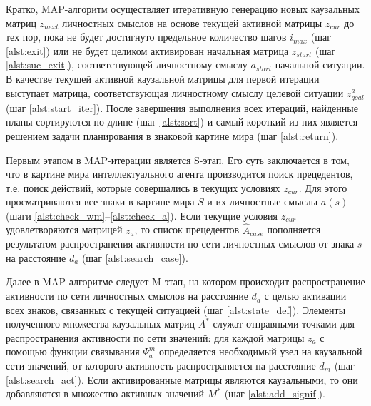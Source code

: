 \documentclass[12pt]{report}
\begin{document}
	Кратко, MAP-алгоритм осуществляет итеративную генерацию новых каузальных матриц $z_{next}$ личностных смыслов на основе текущей активной матрицы $z_{cur}$ до тех пор, пока не будет достигнуто предельное количество шагов $i_{max}$ (шаг \ref{alst:exit}) или не будет целиком активирован начальная матрица $z_{start}$ (шаг \ref{alst:suc_exit}), соответствующей личностному смыслу $a_{start}$ начальной ситуации. В качестве текущей активной каузальной матрицы для первой итерации выступает матрица, соответствующая личностному смыслу целевой ситуации $z_{goal}^a$ (шаг \ref{alst:start_iter}). После завершения выполнения всех итераций, найденные планы сортируются по длине (шаг \ref{alst:sort}) и самый короткий из них является решением задачи планирования в знаковой картине мира (шаг \ref{alst:return}).
	
	Первым этапом в MAP-итерации является S-этап. Его суть заключается в том, что в картине мира интеллектуального агента производится поиск прецедентов, т.е. поиск действий, которые совершались в текущих условиях $z_{cur}$. Для этого просматриваются все знаки в картине мира $S$ и их личностные смыслы $a(s)$ (шаги \ref{alst:check_wm}--\ref{alst:check_a}). Если текущие условия $z_{cur}$ удовлетворяются матрицей $z_a$, то список прецедентов $\hat A_{case}$ пополняется результатом распространения активности по сети личностных смыслов от знака $s$ на расстояние $d_a$ (шаг \ref{alst:search_case}).
	
	\begin{algorithm}
		\begin{algorithmic}[1]
			
		\end{algorithmic}
	\end{algorithm}
	
	Далее в MAP-алгоритме следует M-этап, на котором происходит распространение активности по сети личностных смыслов на расстояние $d_a$ с целью активации всех знаков, связанных с текущей ситуацией (шаг \ref{alst:state_def}). Элементы полученного множества каузальных матриц $A^*$ служат отправными точками для распространения активности по сети значений: для каждой матрицы $z_a$ с помощью функции связывания $\Psi_a^m$ определяется необходимый узел на каузальной сети значений, от которого активность распространяется на расстояние $d_m$ (шаг \ref{alst:search_act}). Если активированные матрицы являются каузальными, то они добавляются в множество активных значений $M^*$ (шаг \ref{alst:add_signif}).
	
\end{document}
